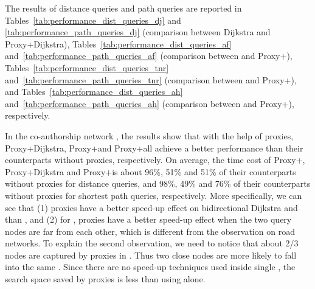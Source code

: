 The results of distance queries and path queries are reported in Tables~\ref{tab:performance_dist_queries_dj} and \ref{tab:performance_path_queries_dj} (comparison between Dijkstra and Proxy+Dijkstra), Tables~\ref{tab:performance_dist_queries_af} and~\ref{tab:performance_path_queries_af} (comparison between \arcflag and Proxy+\arcflag), Tables~\ref{tab:performance_dist_queries_tnr} and~\ref{tab:performance_path_queries_tnr} (comparison between \tnr and Proxy+\tnr), and Tables~\ref{tab:performance_dist_queries_ah} and~\ref{tab:performance_path_queries_ah} (comparison between \ah and Proxy+\ah), respectively.

In the co-authorship network \dblpone, the results show that with the help of proxies, Proxy+Dijkstra, Proxy+\arcflag and Proxy+\tnr all achieve a better performance than their counterparts without proxies, respectively. On average, the time cost of Proxy+\arcflag, Proxy+Dijkstra and Proxy+\tnr is about 96\%, 51\% and 51\% of their counterparts without proxies for distance queries, and 98\%, 49\% and 76\% of their counterparts without proxies for shortest path queries, respectively. More specifically, we can see that (1) proxies have a better speed-up effect on bidirectional Dijkstra and \tnr than \arcflag, and (2) for \arcflag, proxies have a better speed-up effect when the two query nodes are far from each other, which is different from the observation on road networks. To explain the second observation, we need to notice that about 2/3 nodes are captured by proxies in \dblpone. Thus two close nodes are more likely to fall into the same \dras. Since there are no speed-up techniques used inside single \dras, the search space saved by proxies is less than using \arcflag alone.

